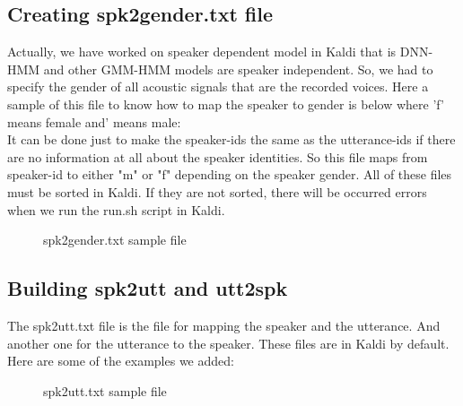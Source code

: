 \documentclass{standalone}
\begin{document}
\subsection{Creating spk2gender.txt file}
Actually, we have worked on speaker dependent model in Kaldi that is DNN-HMM and other GMM-HMM models are speaker independent. So, we had to specify the gender of all acoustic signals that are the recorded voices. Here a sample of this file to know how to map the speaker to gender is below where 'f' means female and' means male: \\
It can be done just to make the speaker-ids the same as the utterance-ids if there are no information at all about the speaker identities.
So this file maps from speaker-id to either "m" or "f" depending on the speaker gender. All of these files must be sorted in Kaldi. If they are not sorted, there will be occurred errors when we run the run.sh script in Kaldi.

   \begin{figure}[h]
 \centering
 \caption{spk2gender.txt sample file}
\label{fig:spk2gender}
\end{figure}

    \subsection{Building spk2utt and utt2spk}
  The spk2utt.txt file is the file for mapping the speaker and the utterance. And another one for the utterance to the speaker. These files are in Kaldi by default. Here are some of the examples we added:   \\   
   \begin{figure}[h]
 \centering
 \caption{spk2utt.txt sample file}
\label{fig:spk2utt}
\end{figure}    
\end{document}
